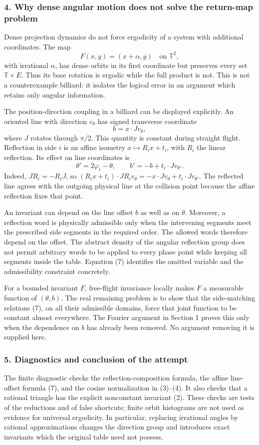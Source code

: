 \documentclass[11pt]{article}
\begin{document}
\subsubsection{4. Why dense angular motion does not solve the return-map problem}
Dense projection dynamics do not force ergodicity of a system with additional coordinates. The map
\[
 F(x,y)=(x+\alpha,y)\quad\text{on }\mathbb T^2,
\]
with irrational $\alpha$, has dense orbits in its first coordinate but preserves every set $\mathbb T\times E$. Thus its base rotation is ergodic while the full product is not. This is not a counterexample billiard: it isolates the logical error in an argument which retains only angular information.

The position-direction coupling in a billiard can be displayed explicitly. An oriented line with direction $v_\theta$ has signed transverse coordinate
\[
 b=x\cdot Jv_\theta,
\]
where $J$ rotates through $\pi/2$. This quantity is constant during straight flight. Reflection in side $i$ is an affine isometry $x\mapsto R_i x+t_i$, with $R_i$ the linear reflection. Its effect on line coordinates is
\[
 \theta'=2\varphi_i-\theta,
 \qquad b'=-b+t_i\cdot Jv_{\theta'}.                    \tag{7}
\]
Indeed, $JR_i=-R_iJ$, so
$(R_ix+t_i)\cdot JR_iv_\theta=-x\cdot Jv_\theta+t_i\cdot Jv_{\theta'}$.
The reflected line agrees with the outgoing physical line at the collision point because the affine reflection fixes that point.

An invariant can depend on the line offset $b$ as well as on $\theta$. Moreover, a reflection word is physically admissible only when the intervening segments meet the prescribed side segments in the required order. The allowed words therefore depend on the offset. The abstract density of the angular reflection group does not permit arbitrary words to be applied to every phase point while keeping all segments inside the table. Equation (7) identifies the omitted variable and the admissibility constraint concretely.

For a bounded invariant $F$, free-flight invariance locally makes $F$ a measurable function of $(\theta,b)$. The real remaining problem is to show that the side-matching relations (7), on all their admissible domains, force that joint function to be constant almost everywhere. The Fourier argument in Section 1 proves this only when the dependence on $b$ has already been removed. No argument removing it is supplied here.

\subsubsection{5. Diagnostics and conclusion of the attempt}
The finite diagnostic checks the reflection-composition formula, the affine line-offset formula (7), and the cosine normalization in (3)--(4). It also checks that a rational triangle has the explicit nonconstant invariant (2). These checks are tests of the reductions and of false shortcuts; finite orbit histograms are not used as evidence for universal ergodicity. In particular, replacing irrational angles by rational approximations changes the direction group and introduces exact invariants which the original table need not possess.
\end{document}
